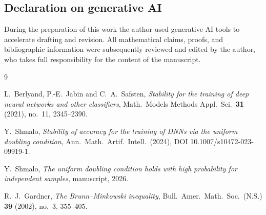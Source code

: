 ﻿\documentclass[11pt]{article}
\begin{document}
\subsection*{Declaration on generative AI}
During the preparation of this work the author used generative AI tools to
accelerate drafting and revision.  All mathematical claims, proofs, and
bibliographic information were subsequently reviewed and edited by the author,
who takes full responsibility for the content of the manuscript.

\begin{thebibliography}{9}

L.~Berlyand, P.-E.~Jabin and C.~A.~Safsten,
\emph{Stability for the training of deep neural networks and other classifiers},
Math.\ Models Methods Appl.\ Sci.\ \textbf{31} (2021), no.~11, 2345--2390.

Y.~Shmalo,
\emph{Stability of accuracy for the training of DNNs via the uniform doubling
condition},
Ann.\ Math.\ Artif.\ Intell.\ (2024), DOI 10.1007/s10472-023-09919-1.

Y.~Shmalo,
\emph{The uniform doubling condition holds with high probability for
independent samples},
manuscript, 2026.

R.~J.~Gardner,
\emph{The Brunn--Minkowski inequality},
Bull.\ Amer.\ Math.\ Soc.\ (N.S.) \textbf{39} (2002), no.~3, 355--405.

\end{thebibliography}
\end{document}
